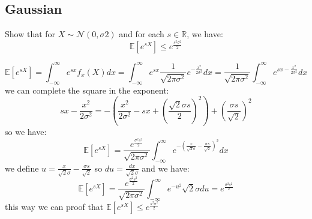 \subsection{Gaussian}
Show that for $X \sim \mathcal{N} (0, \sigma2)$ and for each $s \in \mathbb{R}$, we have:
$$\mathbb{E}[e^{sX}] \leq e^{\frac{s^2\sigma^2}{2}}$$
\begin{qsolve}
	\begin{qsolve}[]
		$$\mathbb{E}[e^{sX}] =\int_{-\infty}^{\infty} e^{sx} f_x(X) dx = \int_{-\infty}^{\infty} e^{sx} \dfrac{1}{\sqrt{2\pi\sigma^2}} e^{-\frac{x^2}{2\sigma^2}} dx = \dfrac{1}{\sqrt{2\pi\sigma^2}} \int_{-\infty}^{\infty} e^{sx -\frac{x^2}{2\sigma^2}} dx$$
		\splitqsolve[\splitqsolve]
		we can complete the square in the exponent:
		$$sx -\frac{x^2}{2\sigma^2} = -(\frac{x^2}{2\sigma^2}-sx + (\frac{\sqrt{2}\sigma s}{2})^2) + (\frac{\sigma s}{\sqrt{2}})^2$$
		so we have:
		$$\mathbb{E}[e^{sX}] = \dfrac{e^{\frac{\sigma^2 s^2}{2}}}{\sqrt{2\pi\sigma^2}} \int_{-\infty}^{\infty} e^{-(\frac{x}{\sqrt{2}\sigma} - \frac{\sigma s}{\sqrt{2}})^2} dx$$
		we define $ u = \frac{x}{\sqrt{2}\sigma} - \frac{\sigma s}{\sqrt{2}}$ so $du = \frac{dx}{\sqrt{2}\sigma}$ and we have:
		$$\mathbb{E}[e^{sX}] = \dfrac{e^{\frac{\sigma^2 s^2}{2}}}{\sqrt{2\pi\sigma^2}} \int_{-\infty}^{\infty} e^{-u^2} \sqrt{2}\sigma du = e^{\frac{\sigma^2 s^2}{2}}$$
		this way we can proof that $\mathbb{E}[e^{sX}] \leq e^{\frac{s^2\sigma^2}{2}}$
	\end{qsolve}
\end{qsolve}
